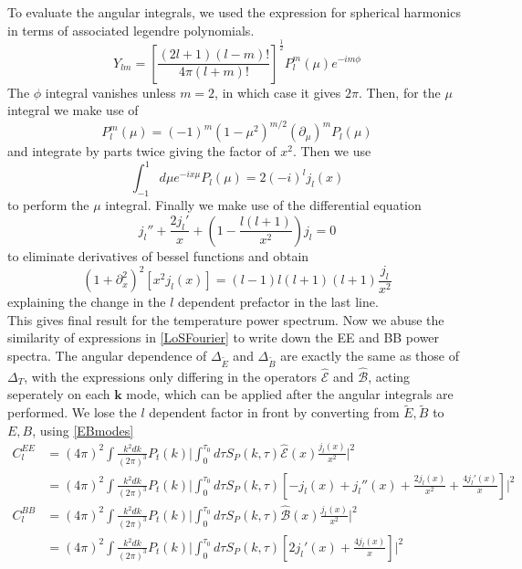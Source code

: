\documentclass[a4paper,10pt]{article}
\renewcommand{\v}[1]{\mathbf{#1}}
\newcommand{\half}{\frac{1}{2}}
\begin{document}
To evaluate the angular integrals, we used the expression for spherical harmonics in terms of associated legendre polynomials.
\begin{equation}
Y_{lm} = \left[\frac{(2l+1)(l-m)!}{4\pi(l+m)!}\right]^\half P_l^m(\mu)e^{-im\phi}
\end{equation}
The $\phi$ integral vanishes unless $m=2$, in which case it gives $2\pi$. Then, for the $\mu$ integral we make use of 
\begin{equation}
P^m_l(\mu)=(-1)^m(1-\mu^2)^{m/2}(\partial_\mu)^mP_l(\mu)
\end{equation}
and integrate by parts twice giving the factor of $x^2$. Then we use 
\begin{equation}
\int_{-1}^1 d\mu e^{-ix\mu}P_l(\mu) = 2(-i)^lj_l(x)
\end{equation}
to perform the $\mu$ integral. Finally we make use of the differential equation
\begin{equation}
j_l''+\frac{2j_l'}{x}+\left(1-\frac{l(l+1)}{x^2}\right)j_l=0
\end{equation}
to eliminate derivatives of bessel functions and obtain
\begin{equation}
(1+\partial_x^2)^2[x^2j_l(x)] = (l-1)l(l+1)(l+1)\frac{j_l}{x^2}
\end{equation}
explaining the change in the $l$ dependent prefactor in the last line.\\

This gives final result for the temperature power spectrum. Now we abuse the similarity of expressions in \ref{LoSFourier} to write down the EE and BB power spectra. The angular dependence of $\Delta_{\tilde{E}}$ and $\Delta_{\tilde{B}}$ are exactly the same as those of $\Delta_T$, with the expressions only differing in the operators $\hat{\mathcal{E}}$ and $\hat{\mathcal{B}}$, acting seperately on each $\v{k}$ mode, which can be applied after the angular integrals are performed. We lose the $l$ dependent factor in front by converting from $\tilde{E}, \tilde{B}$ to $E,B$, using \ref{EBmodes}
\begin{equation}\begin{split}
C_l^{EE} &= (4\pi)^2 \int \frac{k^2dk}{(2\pi)^3}  P_t(k) \bigg|  \int_0^{\tau_0}d\tau  S_P(k,\tau)\hat{\mathcal{E}}(x)\frac{j_l(x)}{x^2} \bigg|^2\\
&= (4\pi)^2\int \frac{k^2dk}{(2\pi)^3}  P_t(k) \bigg|  \int_0^{\tau_0}d\tau  S_P(k,\tau)[-j_l(x) +j_l''(x)+\frac{2j_l(x)}{x^2} + \frac{4j_l'(x)}{x}]\bigg|^2\\
C_l^{BB} &= (4\pi)^2 \int \frac{k^2dk}{(2\pi)^3} P_t(k) \bigg|  \int_0^{\tau_0}d\tau  S_P(k,\tau)\hat{\mathcal{B}}(x)\frac{j_l(x)}{x^2} \bigg|^2\\
&= (4\pi)^2\int \frac{k^2dk}{(2\pi)^3}  P_t(k) \bigg|  \int_0^{\tau_0} d\tau S_P(k,\tau)[2j_l'(x)+\frac{4j_l(x)}{x}]\bigg|^2
\label{primordialBmodes}
\end{split}\end{equation}
\end{document}
